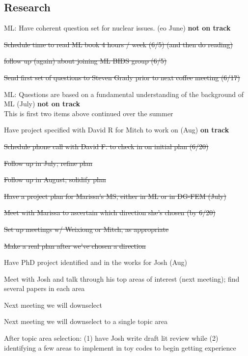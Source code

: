\documentclass[12pt,twoside]{article}
\begin{document}
\subsection{Research}
\begin{compactitem}
\item ML: Have coherent question set for nuclear issues. (eo June) \textbf{not on track}
  \begin{compactitem}
  \item \st{Schedule time to read ML book 4 hours / week (6/5) (and then do reading)}
  \item \st{follow up (again) about joining ML BIDS group (6/5)}
  \item \st{Send first set of questions to Steven Grady prior to next coffee meeting (6/17)}
  \end{compactitem}  

\item ML: Questions are based on a fundamental understanding of the background of ML (July) \textbf{not on track}\\
\hspace*{2em} This is first two items above continued over the summer

\item Have project specified with David R for Mitch to work on (Aug) \textbf{on track}
  \begin{compactitem}
  \item \st{Schedule phone call with David F. to check in on initial plan (6/20)}
  \item \st{Follow up in July; refine plan}
  \item \st{Follow up in August; solidify plan}
  \end{compactitem}
  
\item \st{Have a project plan for Marissa's MS, either in ML or in DG-FEM (July)}
  \begin{compactitem}
  \item \st{Meet with Marissa to ascertain which direction she's chosen (by 6/20)}
  \item \st{Set up meetings w/ Weixiong or Mitch, as appropriate}
  \item \st{Make a real plan after we've chosen a direction}
  \end{compactitem}

\item Have PhD project identified and in the works for Josh (Aug)
  \begin{compactitem}
  \item Meet with Josh and talk through his top areas of interest (next meeting); find several papers in each area
  \item Next meeting we will downselect
  \item Next meeting we will downselect to a single topic area
  \item After topic area selection: (1) have Josh write draft lit review while (2) identifying a few areas to implement in toy codes to begin getting experience
  \end{compactitem}


\end{compactitem}
\end{document}
